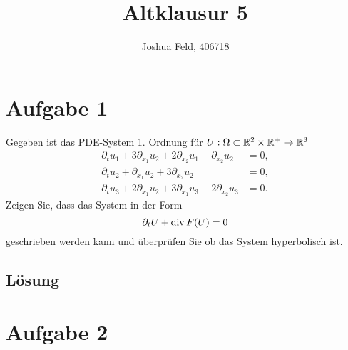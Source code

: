 \documentclass{exercise}
\institute{Applied and Computational Mathematics}
\title{Altklausur 5}
\author{Joshua Feld, 406718}
\begin{document}
    \maketitle


    \section*{Aufgabe 1}
    
    \begin{problem}
        Gegeben ist das PDE-System 1. Ordnung für \(U: \Omega \subset \mathbb{R}^2 \times \mathbb{R}^+ \to \mathbb{R}^3\)
        \begin{align*}
            \partial_t u_1 + 3\partial_{x_1}u_2 + 2\partial_{x_2}u_1 + \partial_{x_2}u_2 &= 0,\\
            \partial_t u_2 + \partial_{x_1}u_2 + 3\partial_{x_2}u_2 &= 0,\\
            \partial_t u_3 + 2\partial_{x_1}u_2 + 3\partial_{x_1}u_3 + 2\partial_{x_2}u_3 &= 0.
        \end{align*}
        Zeigen Sie, dass das System in der Form
        \[
            \partial_t U + \vecdiv F\parentheses*{U} = 0
        \]
        geschrieben werden kann und überprüfen Sie ob das System hyperbolisch ist.
    \end{problem}
    
    \subsection*{Lösung}


    \section*{Aufgabe 2}
    
\end{document}
